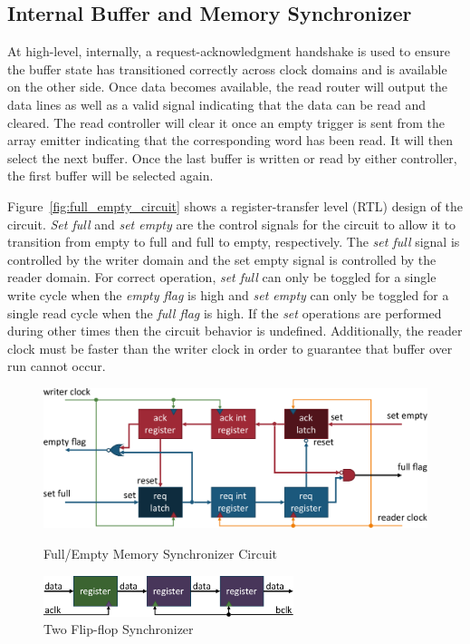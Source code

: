     \subsection{Internal Buffer and Memory Synchronizer}
        \label{sec:memorysync}
        At high-level, internally, a request-acknowledgment handshake is used to ensure the buffer state has transitioned correctly across clock domains and is available on the other side. Once data becomes available, the read router will output the data lines as well as a valid signal indicating that the data can be read and cleared. The read controller will clear it once an empty trigger is sent from the array emitter indicating that the corresponding word has been read. It will then select the next buffer. Once the last buffer is written or read by either controller, the first buffer will be selected again.

        Figure~\ref{fig:full_empty_circuit} shows a register-transfer level (RTL) design of the circuit. {\it Set full} and {\it set empty} are the control signals for the circuit to allow it to transition from empty to full and full to empty, respectively. The {\it set full} signal is controlled by the writer domain and the {set empty} signal is controlled by the reader domain. For correct operation, {\it set full} can only be toggled for a single write cycle when the {\it empty flag} is high and {\it set empty} can only be toggled for a single read cycle when the {\it full flag} is high. If the {\it set} operations are performed during other times then the circuit behavior is undefined. Additionally, the reader clock must be faster than the writer clock in order to guarantee that buffer over run cannot occur.

        \begin{figure}[t]
            \centering
            \includegraphics[width=1.0\textwidth]{fig/full_empty_circuit.pdf}
            \caption{Full/Empty Memory Synchronizer Circuit}
            \label{fig:full_empty_circuit}

            \centering
            \includegraphics[width=0.65\textwidth]{fig/two_flip_flop_synchronizer.pdf}
            \caption{Two Flip-flop Synchronizer}
            \label{fig:two_flip_flop_synchronizer}
        \end{figure}



